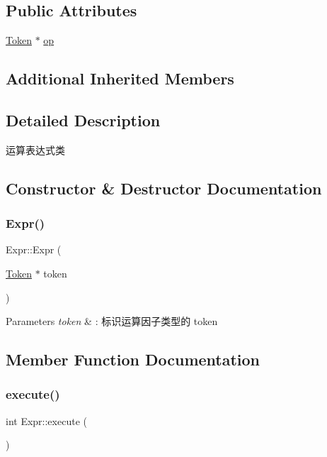 \subsection*{Public Attributes}
\begin{DoxyCompactItemize}
\item 
\hyperlink{class_token}{Token} $\ast$ \hyperlink{class_expr_a5fd7721b7843686e3ec7e63fddf95644}{op}
\end{DoxyCompactItemize}
\subsection*{Additional Inherited Members}


\subsection{Detailed Description}
运算表达式类 

\subsection{Constructor \& Destructor Documentation}
\mbox{\label{class_expr_a5a045d68e601c2e782e1958d55a07400}} 
\subsubsection{\texorpdfstring{Expr()}{Expr()}}
{\footnotesize\ttfamily Expr\+::\+Expr (\begin{DoxyParamCaption}\item[{\hyperlink{class_token}{Token} $\ast$}]{token }\end{DoxyParamCaption})}


\begin{DoxyParams}{Parameters}
{\em token} & \+: 标识运算因子类型的 token \\
\hline
\end{DoxyParams}


\subsection{Member Function Documentation}
\mbox{\label{class_expr_aff6a2e6eaa460e2a3db28ebdab089b51}} 
\subsubsection{\texorpdfstring{execute()}{execute()}}
{\footnotesize\ttfamily int Expr\+::execute (\begin{DoxyParamCaption}{ }\end{DoxyParamCaption})\hspace{0.3cm}{\ttfamily [virtual]}}

